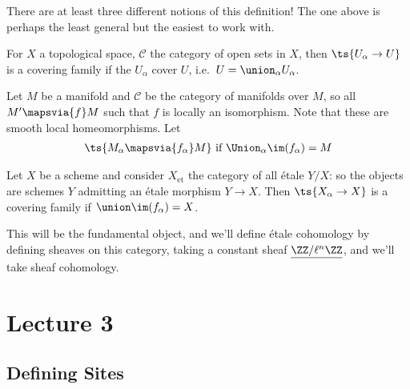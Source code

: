\begin{warnings}

There are at least three different notions of this definition! The one
above is perhaps the least general but the easiest to work with.

\end{warnings}

\begin{example}[?]

For \(X\) a topological space, \(\mathcal{C}\) the category of open sets
in \(X\), then \(\ts{U_\alpha\to U}\) is a covering family if the
\(U_\alpha\) cover \(U\), i.e.~\(U = \union_\alpha U_\alpha\).

\end{example}

\begin{example}

Let \(M\) be a manifold and \(\mathcal{C}\) be the category of manifolds
over \(M\), so all \(M' \mapsvia{f} M\) such that \(f\) is locally an
isomorphism. Note that these are smooth local homeomorphisms. Let
\begin{align*}
\ts{M_\alpha \mapsvia{f_\alpha} M} \text{ if } \Union_\alpha \im (f_\alpha) = M
\end{align*}

\end{example}

\begin{example}

Let \(X\) be a scheme and consider \(X_{\text{et}}\) the category of all
étale \(Y/X\): so the objects are schemes \(Y\) admitting an étale
morphism \(Y\to X\). Then \(\ts{X_\alpha\to X}\) is a covering family if
\(\union \im (f_\alpha) = X\).

\end{example}

This will be the fundamental object, and we'll define étale cohomology
by defining sheaves on this category, taking a constant sheaf
\(\underline{\ZZ/\ell^n\ZZ}\), and we'll take sheaf cohomology.

\hypertarget{lecture-3}{%
\section{Lecture 3}\label{lecture-3}}

\hypertarget{defining-sites}{%
\subsection{Defining Sites}\label{defining-sites}}

